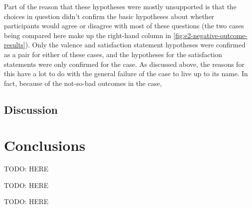Part of the reason that these hypotheses were mostly unsupported is that the choices in question didn't confirm the basic hypotheses about whether participants would agree or disagree with most of these questions (the two cases being compared here make up the right-hand column in \cref{fig:e2-negative-outcome-results}).
%
Only the valence and satisfaction statement hypotheses were confirmed as a pair for either of these cases, and the hypotheses for the satisfaction statements were only confirmed for the \unxf{} case.
%
As discussed above, the reasons for this have a lot to do with the general failure of the \obvfm{} case to live up to its name.
%
In fact, because of the not-so-bad outcomes in the \obvfm{} case, 


\subsection{Discussion}

\label{sec:e2-discussion}



\section{Conclusions}



\begin{table}[!p]
\centering
\bgroup
\def\arraystretch{1.3}
\setlength{\tabcolsep}{0.6em}

\egroup
\caption[Retrospective chosen vs. inevitable success results]{TODO: HERE}
  \label{tab:e2-chosen-vs-inevitable-success-results}
\end{table}

\begin{table}[!p]
\centering
\bgroup
\def\arraystretch{1.3}
\setlength{\tabcolsep}{0.6em}

\egroup
\caption[Retrospective good vs. bad unexpected results]{TODO: HERE}
  \label{tab:e2-good-vs-bad-unexpected-results}
\end{table}

\begin{table}[!p]
\centering
\bgroup
\def\arraystretch{1.3}
\setlength{\tabcolsep}{0.6em}

\egroup
\caption[Retrospective expected vs. unexpected failure results]{TODO: HERE}
  \label{tab:e2-expected-vs-unexpected-failure-results}
\end{table}

